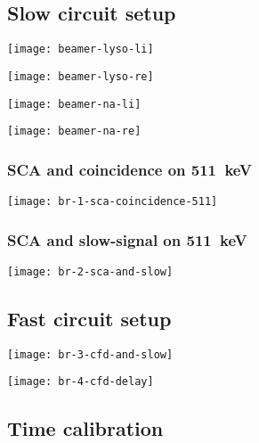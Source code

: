 \documentclass[english, fleqn]{beamer}
\newcommand\oscillatorSize{0.7}
\begin{document}
\subsection{Slow circuit setup}

\begin{frame}

    \centering
    \texttt{[image: beamer-lyso-li]}
\end{frame}

\begin{frame}

    \centering
    \texttt{[image: beamer-lyso-re]}
\end{frame}

\begin{frame}

    \centering
    \texttt{[image: beamer-na-li]}
\end{frame}

\begin{frame}

    \centering
    \texttt{[image: beamer-na-re]}
\end{frame}

\begin{frame}
    \frametitle{SCA and coincidence on \SI{511}{\kilo\electronvolt}}

    \centering
    \texttt{[image: br-1-sca-coincidence-511]}
\end{frame}

\begin{frame}
    \frametitle{SCA and slow-signal on \SI{511}{\kilo\electronvolt}}

    \centering
    \texttt{[image: br-2-sca-and-slow]}
\end{frame}

\subsection{Fast circuit setup}

\begin{frame}
    \texttt{[image: br-3-cfd-and-slow]}
\end{frame}

\begin{frame}
    \texttt{[image: br-4-cfd-delay]}
\end{frame}

\subsection{Time calibration}
\end{document}
